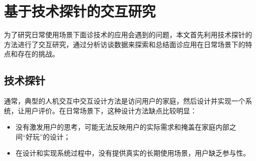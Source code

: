 \chapter{基于技术探针的交互研究}

为了研究日常使用场景下面诊技术的应用会遇到的问题，本文首先利用技术探针\cite{Hutchinson2003Technology}的方法进行了交互研究，通过分析访谈数据来探索和总结面诊应用在日常场景下的特点和存在的挑战。


\section{技术探针}

通常，典型的人机交互中交互设计方法是访问用户的家庭，然后设计并实现一个系统，让用户评价。在日常场景下，这种设计方法缺点比较明显\cite{Hutchinson2003Technology}：

\begin{itemize}
    \item 没有激发用户的思考，可能无法反映用户的实际需求和掩盖在家庭内部之间“好玩”的设计；

    \item 在设计和实现系统过程中，没有提供真实的长期使用场景，用户缺乏参与性。  
\end{itemize}

